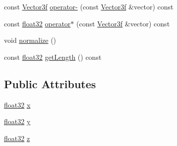 \begin{DoxyCompactItemize}
\item 
const \hyperlink{classvmath_1_1Vector3f}{Vector3f} \hyperlink{classvmath_1_1Vector3f_afb013ec02986559c48814dd61248e0bf}{operator-\/} (const \hyperlink{classvmath_1_1Vector3f}{Vector3f} \&vector) const 
\item 
const \hyperlink{namespacecompatibility_a32a2d006ac2172c0f859370287f0104c}{float32} \hyperlink{classvmath_1_1Vector3f_a8e95404bcc1cd481c0467daabc7898c4}{operator$\ast$} (const \hyperlink{classvmath_1_1Vector3f}{Vector3f} \&vector) const 
\item 
void \hyperlink{classvmath_1_1Vector3f_a0893f04b462cc37e960a4fdea3ba8e4d}{normalize} ()
\item 
const \hyperlink{namespacecompatibility_a32a2d006ac2172c0f859370287f0104c}{float32} \hyperlink{classvmath_1_1Vector3f_a33de43b35123995780b7fcc18ea21a58}{getLength} () const 
\end{DoxyCompactItemize}
\subsection*{Public Attributes}
\begin{DoxyCompactItemize}
\item 
\hyperlink{namespacecompatibility_a32a2d006ac2172c0f859370287f0104c}{float32} \hyperlink{classvmath_1_1Vector3f_adfc960779db8a0dd2f9670af4d075a4a}{x}
\item 
\hyperlink{namespacecompatibility_a32a2d006ac2172c0f859370287f0104c}{float32} \hyperlink{classvmath_1_1Vector3f_a22cb6b05462c55b6d5475d37dbc667f4}{y}
\item 
\hyperlink{namespacecompatibility_a32a2d006ac2172c0f859370287f0104c}{float32} \hyperlink{classvmath_1_1Vector3f_ae4aaae3b4db7ef3c3e30d7c66cb9aa76}{z}
\end{DoxyCompactItemize}



